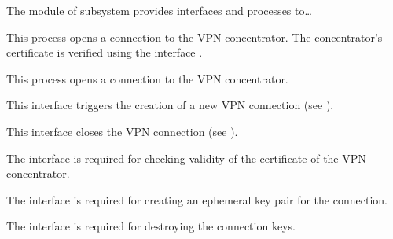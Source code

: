 


The module  of subsystem  provides interfaces and processes to…



This process opens a connection to the VPN concentrator. The concentrator's
certificate is verified using the interface
.



This process opens a connection to the VPN concentrator.





This interface triggers the creation of a new VPN connection (see ).


This interface closes the VPN connection (see ).


The interface  is required for checking
validity of the certificate of the VPN concentrator.


The interface  is required for
creating an ephemeral key pair for the connection.


The interface  is required for
destroying the connection keys.


